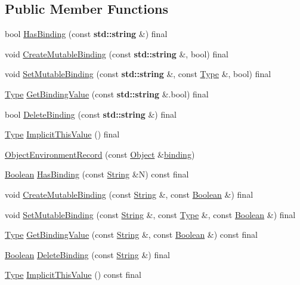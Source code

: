 \subsection*{Public Member Functions}
\begin{DoxyCompactItemize}
\item 
bool \hyperlink{struct_object_environment_record_a02908375958d95ff57da4f24572949f4}{Has\+Binding} (const \textbf{ std\+::string} \&) final
\item 
void \hyperlink{struct_object_environment_record_ae54124ae909a73fb5d3b8e9f7b9f3807}{Create\+Mutable\+Binding} (const \textbf{ std\+::string} \&, bool) final
\item 
void \hyperlink{struct_object_environment_record_acbc8e93de3f48c41c0413957974642b0}{Set\+Mutable\+Binding} (const \textbf{ std\+::string} \&, const \hyperlink{class_type}{Type} \&, bool) final
\item 
\hyperlink{class_type}{Type} \hyperlink{struct_object_environment_record_ad0e2d2c1d5010c81bee1df1988260dc7}{Get\+Binding\+Value} (const \textbf{ std\+::string} \&.bool) final
\item 
bool \hyperlink{struct_object_environment_record_a19be623695ff3da2895707cde2e014b9}{Delete\+Binding} (const \textbf{ std\+::string} \&) final
\item 
\hyperlink{class_type}{Type} \hyperlink{struct_object_environment_record_a8b10ec38bc18347950dffdfb4d34a634}{Implicit\+This\+Value} () final
\item 
\hyperlink{struct_object_environment_record_ae71db7c77c0d6829e8b73eb14ca0e601}{Object\+Environment\+Record} (const \hyperlink{struct_object}{Object} \&\hyperlink{struct_object_environment_record_ac373ab33014da05eb9d81ed78429b1ca}{binding})
\item 
\hyperlink{struct_boolean}{Boolean} \hyperlink{struct_object_environment_record_a88d20bcdf70ed4b5f5a837b99e26a963}{Has\+Binding} (const \hyperlink{struct_string}{String} \&N) const final
\item 
void \hyperlink{struct_object_environment_record_a253c1137a60f79ea6d07ec89d04ca067}{Create\+Mutable\+Binding} (const \hyperlink{struct_string}{String} \&, const \hyperlink{struct_boolean}{Boolean} \&) final
\item 
void \hyperlink{struct_object_environment_record_a495af7053fd2a7b122a56b31418f7324}{Set\+Mutable\+Binding} (const \hyperlink{struct_string}{String} \&, const \hyperlink{class_type}{Type} \&, const \hyperlink{struct_boolean}{Boolean} \&) final
\item 
\hyperlink{class_type}{Type} \hyperlink{struct_object_environment_record_a8b7aabb730c9d2bd738f32b4a36e6bf4}{Get\+Binding\+Value} (const \hyperlink{struct_string}{String} \&, const \hyperlink{struct_boolean}{Boolean} \&) const final
\item 
\hyperlink{struct_boolean}{Boolean} \hyperlink{struct_object_environment_record_a86c73af4072c8a60c80ca98113f608fd}{Delete\+Binding} (const \hyperlink{struct_string}{String} \&) final
\item 
\hyperlink{class_type}{Type} \hyperlink{struct_object_environment_record_a4c620b161bb8939304bb688bfa2e5d3b}{Implicit\+This\+Value} () const final
\end{DoxyCompactItemize}
